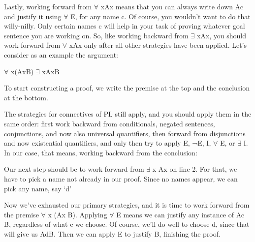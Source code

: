 Lastly, working forward from $\forall$ xAx means that you can always write down Ac and justify it using $\forall$ E, for any name c. Of course, you wouldn’t want to do that willy-nilly. Only certain names c will help in your task of proving whatever goal sentence you are working on. So, like working backward from $\exists$ xAx, you should work forward from $\forall$ xAx only after all other strategies have been applied. Let’s consider as an example the argument:
\begin{center}
$\forall$ x(Ax\eif B) \therefore $\exists$ xAx\eif B
\end{center}
To start constructing a proof, we write the premise at the top and the conclusion at the bottom.
\begin{fitchproof}
\ellipsesline
{}
\end{fitchproof}
The strategies for connectives of PL still apply, and you should apply them in the same order: first work backward from conditionals, negated sentences, conjunctions, and now also universal quantifiers, then forward from disjunctions and now existential quantifiers, and only then try to apply \eif E, ¬E, \eor I, $\forall$ E, or $\exists$ I. In our case, that means, working backward from the conclusion:
\begin{fitchproof}
\open
{}
\ellipsesline
{}
\close
{}
\end{fitchproof}

Our next step should be to work forward from $\exists$ x Ax on line 2. For that, we have to pick a name not already in our proof. Since no names appear, we can pick any name, say ‘d’
\begin{fitchproof}
\open
{}
\open
{}
\ellipsesline
{}
\close
{}
\close
{}
\end{fitchproof}

Now we’ve exhausted our primary strategies, and it is time to work forward from the premise $\forall$ x (Ax \eif  B). Applying $\forall$ E means we can justify any instance of Ac \eif  B, regardless of what c we choose. Of course, we’ll do well to choose d, since that will give us Ad\eif B. Then we can apply \eif E to justify B, finishing the proof.
\begin{fitchproof}
\open
{}
\open
{}
\close
{}
\close
{}
\end{fitchproof}

